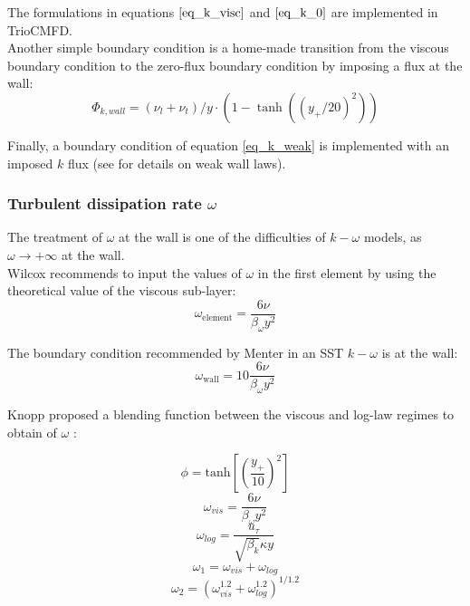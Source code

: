 The formulations in equations $\eqref{eq_k_visc}$ and $\eqref{eq_k_0}$ are implemented in TrioCMFD. \\

Another simple boundary condition is a home-made transition from the viscous boundary condition to the zero-flux boundary condition by imposing a flux at the wall:
\begin{equation}\label{eq_k_blending}
	\Phi_{k, wall} = (\nu_l + \nu_t)/y \cdot (1-\tanh((y_+/20)^2))
\end{equation}

Finally, a boundary condition of equation \ref{eq_k_weak} is implemented with an imposed $k$ flux (see \cite{Mierka2007} for details on weak wall laws).

\subsubsection{Turbulent dissipation rate $\omega$}

The treatment of $\omega$ at the wall is one of the difficulties of $k-\omega$ models, as $\omega\rightarrow+\infty$ at the wall. \\

Wilcox recommends to input the values of $\omega$ in the first element by using the theoretical value of the viscous sub-layer: 
\begin{equation}
	\omega_\text{element} = \frac{6\nu}{\beta_\omega y^2}
\end{equation}

The boundary condition recommended by Menter in an SST $k-\omega$ \cite{Menter1993} is at the wall: 
\begin{equation}
	\omega_\text{wall} = 10 \frac{6\nu}{\beta_\omega y^2}
\end{equation}

Knopp proposed a blending function between the viscous and log-law regimes to obtain of $\omega$ \cite{Knopp2007}:

\begin{equation}
	\phi = \text{tanh}\left[\left(\frac{y_+}{10}\right)^2\right]
\end{equation}
\begin{equation}
	\omega_{vis} = \frac{6\nu}{\beta_\omega y^2}
\end{equation}
\begin{equation}
	\omega_{log} = \frac{u_\tau}{\sqrt{\beta_k}\kappa y}
\end{equation}
\begin{equation}
	\omega_{1} = \omega_{vis}+\omega_{log}
\end{equation}
\begin{equation}
	\omega_{2} =(\omega_{vis}^{1.2}+\omega_{log}^{1.2})^{1/1.2}
\end{equation}

